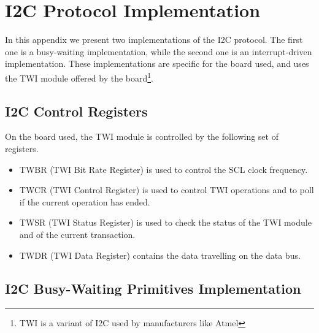 \chapter{I2C Protocol Implementation}\label{i2c_implementation}

In this appendix we present two implementations of the I2C protocol. The first one is a busy-waiting implementation, while the second one is an interrupt-driven implementation. These implementations are specific for the board used\supercite{mega2560_datasheet}, and uses the TWI module offered by the board\footnote{TWI is a variant of I2C used by manufacturers like Atmel}.

\section{I2C Control Registers}

On the board used, the TWI module is controlled by the following set of registers.
\begin{itemize}
	\item TWBR (TWI Bit Rate Register) is used to control the SCL clock frequency.
	\item TWCR (TWI Control Register) is used to control TWI operations and to poll if the current operation has ended.
	\item TWSR (TWI Status Register) is used to check the status of the TWI module and of the current transaction.
	\item TWDR (TWI Data Register) contains the data travelling on the data bus.
\end{itemize}

\section{I2C Busy-Waiting Primitives Implementation}\label{i2c_primitives}

